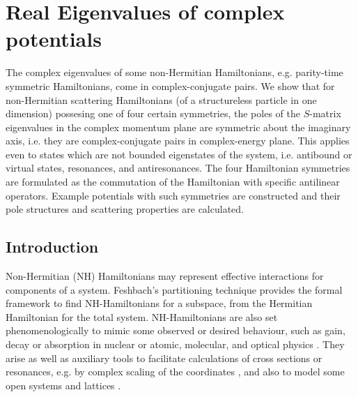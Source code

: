 
\chapter{Real Eigenvalues of complex potentials}
\label{ChapterRealEigenValues}
%
The complex eigenvalues of some non-Hermitian Hamiltonians, e.g. parity-time symmetric Hamiltonians, come in complex-conjugate pairs. We show that for non-Hermitian scattering Hamiltonians (of a structureless particle in one dimension) possesing one of four certain symmetries, the poles of the $S$-matrix eigenvalues in the complex  momentum plane are symmetric about the imaginary axis, i.e. they  are complex-conjugate pairs in complex-energy plane. This applies even to states which are not bounded eigenstates of the system, i.e. antibound or virtual states, resonances, and antiresonances. The four Hamiltonian symmetries are formulated as the commutation of the Hamiltonian with specific antilinear operators. Example potentials with such symmetries are constructed and their pole structures and scattering properties are calculated.
%
\newpage
%
%
\section{Introduction}
%
%
%
%
Non-Hermitian (NH) Hamiltonians may represent effective interactions for components of a system. Feshbach's partitioning technique \cite{Feshbach1958,Feshbach1962} provides the formal framework to find NH-Hamiltonians for a subspace, from the Hermitian Hamiltonian for the total system. NH-Hamiltonians are also set phenomenologically to mimic some observed or desired behaviour, such as gain, decay or absorption in nuclear or atomic, molecular, and optical physics \cite{Muga2004,Feng2017,El-Ganainy2018,Moiseyev2011,Longhi2017a,Konotop2016}. They arise as well as auxiliary tools to facilitate calculations of cross sections  or resonances, e.g. by complex scaling of the coordinates \cite{Aguilar1971,Balslev1971}, and also to model some open systems \cite{Rotter2009} and lattices \cite{Alvarez2018}.

